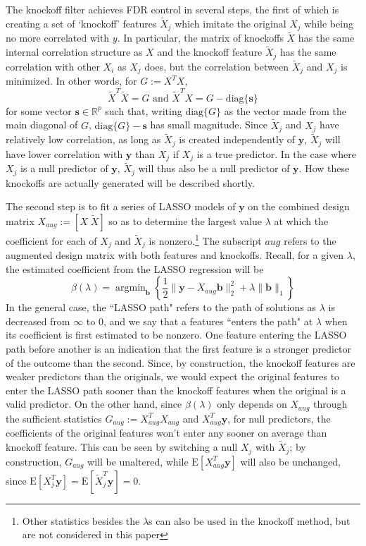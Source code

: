 \documentclass[11pt]{article}
\newcommand{\R}{\mathbb{R}}
\newcommand{\E}{\mathrm{E}}
\newcommand{\diag}[1]{\mathrm{diag}\{#1\}}
\theoremstyle{definition}
\DeclareMathOperator*{\argmin}{arg\min}
\begin{document}
    The knockoff filter achieves FDR control in several steps, the first of which is creating a set of `knockoff' features $\tilde X_j$ which imitate the original $X_j$ while being no more correlated with $y$. In particular, the matrix of knockoffs $\tilde X$ has the same internal correlation structure as $X$ and the knockoff feature $\tilde X_j$ has the same correlation with other $X_i$ as $X_j$ does, but the correlation between $\tilde X_j$ and $X_j$ is minimized. In other words, for $G := X^TX$, 
    \[ \tilde X^T\tilde X=G \textrm{ and } \tilde X^T X = G - \diag{\mathbf s}\]
    for some vector $\mathbf{s}\in \R^p$ such that, writing $\diag{G}$ as the vector made from the main diagonal of $G$, $\diag{G} - \mathbf s$ has small magnitude. Since $\tilde X_j$ and $X_j$ have relatively low correlation, as long as $\tilde X_j$ is created independently of $\mathbf y$, $\tilde X_j$ will have lower correlation with $\mathbf y$ than $X_j$ if $X_j$ is a true predictor. In the case where $X_j$ is a null predictor of $\mathbf y$, $\tilde X_j$ will thus also be a null predictor of $\mathbf y$. How these knockoffs are actually generated will be described shortly.\par
    The second step is to fit a series of LASSO models of $\mathbf y$ on the combined design matrix $X_{aug}:=[X \; \tilde X]$ so as to determine the largest value $\lambda$ at which the coefficient for each of $X_j$ and $\tilde X_j$ is nonzero.\footnote{Other statistics besides the $\lambda$s can also be used in the knockoff method, but are not considered in this paper} The subscript $aug$ refers to the augmented design matrix with both features and knockoffs. Recall, for a given $\lambda$, the estimated coefficient from the LASSO regression will be 
    \[ \beta(\lambda) = \argmin_\mathbf b \left\{\frac{1}{2}\|\mathbf y - X_{aug}\mathbf b\|^2_2 + \lambda\|\mathbf{b}\|_1 \right\}\]
    In the general case, the ``LASSO path" refers to the path of solutions as $\lambda$ is decreased from $\infty$ to $0$, and we say that a features ``enters the path" at $\lambda$ when its coefficient is first estimated to be nonzero. One feature entering the LASSO path before another is an indication that the first feature is a stronger predictor of the outcome than the second. Since, by construction, the knockoff features are weaker predictors than the originals, we would expect the original features to enter the LASSO path sooner than the knockoff features when the original is a valid predictor. On the other hand, since $\beta(\lambda)$ only depends on $X_{aug}$ through the sufficient statistics $G_{aug}:=X_{aug}^TX_{aug}$ and $X_{aug}^T\mathbf y$, for null predictors, the coefficients of the original features won't enter any sooner on average than knockoff feature. This can be seen by switching a null $X_j$ with $\tilde X_j$; by construction, $G_{aug}$ will be unaltered, while $\E\left[X_{aug}^T\mathbf y\right]$ will also be unchanged, since $\E[X_j^T\mathbf y]=\E[\tilde X_j^T\mathbf y]=0$. \par
\end{document}
